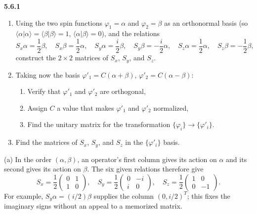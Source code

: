 \par\bigskip
\noindent\textbf{5.6.1}\quad
\begin{enumerate}
\item[(a)] Using the two spin functions $\varphi_{1}=\alpha$ and
  $\varphi_{2}=\beta$ as an orthonormal basis (so
  $\langle\alpha|\alpha\rangle=\langle\beta|\beta\rangle=1$,
  $\langle\alpha|\beta\rangle=0$), and the relations
  \[
  S_{x}\alpha=\frac{1}{2}\beta,\quad S_{x}\beta=\frac{1}{2}\alpha,\quad
  S_{y}\alpha=\frac{i}{2}\beta,\quad S_{y}\beta=-\frac{i}{2}\alpha,\quad
  S_{z}\alpha=\frac{1}{2}\alpha,\quad S_{z}\beta=-\frac{1}{2}\beta,
  \]
  construct the $2\times2$ matrices of $S_{x}$, $S_{y}$, and $S_{z}$.
\item[(b)] Taking now the basis $\varphi'_{1}=C(\alpha+\beta)$,
  $\varphi'_{2}=C(\alpha-\beta)$:
  \begin{enumerate}
  \item[(i)] Verify that $\varphi'_{1}$ and $\varphi'_{2}$ are orthogonal,
  \item[(ii)] Assign $C$ a value that makes $\varphi'_{1}$ and $\varphi'_{2}$
    normalized,
  \item[(iii)] Find the unitary matrix for the transformation
    $\{\varphi_{i}\}\to\{\varphi'_{i}\}$.
  \end{enumerate}
\item[(c)] Find the matrices of $S_{x}$, $S_{y}$, and $S_{z}$ in the
  $\{\varphi'_{i}\}$ basis.
\end{enumerate}
\solution
(a) In the order $(\alpha,\beta)$, an operator's first column gives its
action on $\alpha$ and its second gives its action on $\beta$.
The six given relations therefore give
\[
\boxed{S_x=\frac12\begin{pmatrix}0&1\\1&0\end{pmatrix},\quad
S_y=\frac12\begin{pmatrix}0&-i\\i&0\end{pmatrix},\quad
S_z=\frac12\begin{pmatrix}1&0\\0&-1\end{pmatrix}.}
\]
For example, $S_y\alpha=(i/2)\beta$ supplies the column $(0,i/2)^T$;
this fixes the imaginary signs without an appeal to a memorized matrix.

